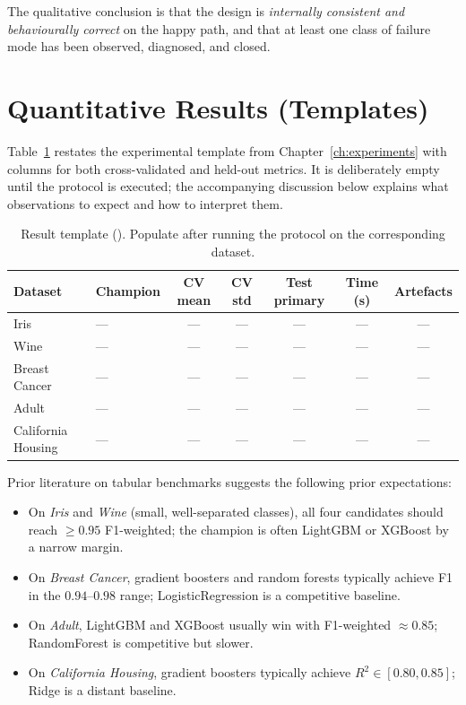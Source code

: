 The qualitative conclusion is that the design is
\emph{internally consistent and behaviourally correct} on the
happy path, and that at least one class of failure mode has been
observed, diagnosed, and closed.

\section{Quantitative Results (Templates)}
\label{sec:quant-results}

Table~\ref{tab:results-template} restates the experimental template
from Chapter~\ref{ch:experiments} with columns for both cross-validated
and held-out metrics. It is deliberately empty until the protocol
is executed; the accompanying discussion below explains what
observations to expect and how to interpret them.

\begin{table}[H]
\centering
\caption{Result template (\exper). Populate after running the
protocol on the corresponding dataset.}
\label{tab:results-template}
\small
\begin{tabularx}{\linewidth}{@{}lXccccc@{}}
\toprule
\textbf{Dataset} & \textbf{Champion} & \textbf{CV mean} & \textbf{CV std} & \textbf{Test primary} & \textbf{Time (s)} & \textbf{Artefacts} \\
\midrule
Iris & --- & --- & --- & --- & --- & --- \\
Wine & --- & --- & --- & --- & --- & --- \\
Breast Cancer & --- & --- & --- & --- & --- & --- \\
Adult & --- & --- & --- & --- & --- & --- \\
California Housing & --- & --- & --- & --- & --- & --- \\
\bottomrule
\end{tabularx}
\end{table}

Prior literature on tabular benchmarks
\citep{grinsztajn2022trees, borisov2022deep, erickson2020autogluon}
suggests the following prior expectations:

\begin{itemize}[leftmargin=1.4em]
  \item On \emph{Iris} and \emph{Wine} (small, well-separated
        classes), all four candidates should reach $\ge 0.95$
        F1-weighted; the champion is often LightGBM or XGBoost by a
        narrow margin.
  \item On \emph{Breast Cancer}, gradient boosters and random
        forests typically achieve F1 in the $0.94$--$0.98$ range;
        LogisticRegression is a competitive baseline.
  \item On \emph{Adult}, LightGBM and XGBoost usually win with
        F1-weighted $\approx 0.85$; RandomForest is competitive but
        slower.
  \item On \emph{California Housing}, gradient boosters typically
        achieve $R^2 \in [0.80, 0.85]$; Ridge is a distant
        baseline.
\end{itemize}

